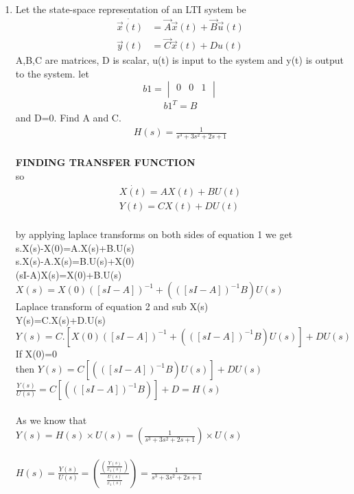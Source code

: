 \begin{enumerate}[label=\thesection.\arabic*.,ref=\thesection.\theenumi]
\item Let the state-space representation of an LTI system be
\begin{align}
\dot{\vec{x}(t)}&=\vec{A}\vec{x}(t)+\vec{B}\vec{u}(t) \\
 \vec{y}(t)&=\vec{C}\vec{x}(t)+D u(t)
\end{align}
A,B,C are matrices, D is scalar, u(t) is input to the system and y(t) is output to the system. let
\begin{equation}
 b1 =\begin{vmatrix}
  0&0&1\\
 \end{vmatrix}
\end{equation}
\begin{align}
b1^T=B
\end{align}
and D=0. Find A and C.
\begin{align}
H(s)=\frac{1}{s^3+3s^2+2s+1}
\end{align}
\solution
\\ \textbf{FINDING TRANSFER FUNCTION}
\\so
\begin{align}
 \dot{X(t)}=AX(t)+BU(t) \\
 Y(t)=CX(t)+DU(t)
\end{align}    
\\by applying laplace transforms on both sides of equation 1
we get
\\s.X(s)-X(0)=A.X(s)+B.U(s)
\\s.X(s)-A.X(s)=B.U(s)+X(0)
\\(sI-A)X(s)=X(0)+B.U(s)
\\$X(s)=X(0)([sI-A])^{-1}+(([sI-A])^{-1}B)U(s)$
\\Laplace transform of equation 2 and sub X(s) 
\\Y(s)=C.X(s)+D.U(s)
\\$Y(s)=C.[X(0)([sI-A])^{-1 }+ (([sI-A])^{-1}B)U(s)]+DU(s)$
\\If X(0)=0
\\then $Y(s)=C[(([sI-A])^{-1}B)U(s)]+DU(s)$
\\$\frac{Y(s)}{U(s)}=C[(([sI-A])^{-1}B)]+D=H(s)$
\\
\\ As we know that
\\ $Y(s)=H(s) \times U(s)= (\frac{1}{s^3+3s^2+2s+1}) \times U(s) $
\\
\\ $H(s)=\frac{Y(s)}{U(s)}=(\frac{(\frac{Y(s)}{x_{1}(s)})}{\frac{U(s)}{x_{1}(s)}})=\frac{1}{s^3+3s^2+2s+1} $

\end{enumerate}

